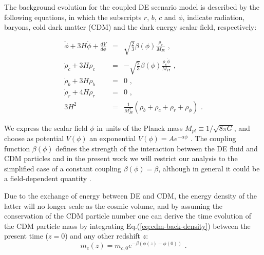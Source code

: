 The background evolution for the coupled DE scenario model is described
by the following equations, in which the subscripts $r$, $b$, $c$
and $\phi$, indicate radiation, baryons, cold dark matter (CDM) and
the dark energy scalar field, respectively:

\begin{eqnarray}
\ddot{\phi}+3H\dot{\phi}+\frac{dV}{d\phi} & = & \sqrt{\frac{2}{3}}\beta(\phi)\frac{\rho_{c}}{M_{Pl}}\,\,,\label{eq:quint-kleingordon}\\
\dot{\rho}_{c}+3H\rho_{c} & = & -\sqrt{\frac{2}{3}}\beta(\phi)\frac{\rho_{c}\dot{\phi}}{M_{Pl}}\,\,,\label{eq:cdm-back-density}\\
\dot{\rho}_{b}+3H\rho_{b} & = & 0\,\,,\\
\dot{\rho}_{r}+4H\rho_{r} & = & 0\,\,,\\
3H^{2} & = & \frac{1}{M_{Pl}^{2}}(\rho_{b}+\rho_{c}+\rho_{r}+\rho_{\phi})\,\,.
\end{eqnarray}


We express the scalar field $\phi$ in units of the Planck
mass $M_{pl}\equiv1/\sqrt{8\pi G}$, and choose as potential $V(\phi)$
an exponential $V(\phi)=Ae^{-\alpha\phi}$ \citep{Lucchin_Matarrese_1984,Wetterich_1988}.
The coupling function $\beta(\phi)$ defines the strength of the interaction
between the DE fluid and CDM particles and in the present work we
will restrict our analysis to the simplified case of a constant coupling
$\beta(\phi)=\beta$, although in general it could be a field-dependent
quantity \cite{Amendola_2004,Baldi_2011a}.

Due to the exchange of energy between DE and CDM, the energy density
of the latter will no longer scale as the cosmic volume, and by assuming
the conservation of the CDM particle number one can derive the time
evolution of the CDM particle mass by integrating Eq.(\ref{eq:cdm-back-density})
between the present time ($z=0$) and any other redshift $z$:
\begin{equation}
m_{c}(z)=m_{c,0}e^{-\beta(\phi(z)-\phi(0))}\,\,.
\end{equation}


